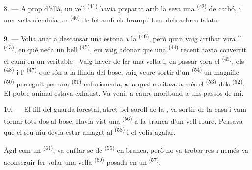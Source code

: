 8. --- A prop d'allà, un vell  \textsuperscript{(41)} havia
preparat amb la seva  una  \textsuperscript{(42)} de
carbó, i una vella s'enduia un  \textsuperscript{(40)} de
 fet amb els branquillons dels arbres talats.

\VUsaut{3.0mm}
\VUsaut{3.0mm}

9. --- Volia anar a descansar una estona a la 
\textsuperscript{(46)}, però quan vaig arribar vora l'
\textsuperscript{(43)}, en què neda un bell  \textsuperscript{(45)},
em vaig adonar que una  \textsuperscript{(44)} recent havia
convertit el camí en un veritable . Vaig haver de fer una volta
i, en passar vora el  \textsuperscript{(49)}, els 
\textsuperscript{(48)} i l' \textsuperscript{(47)} que són a la
llinda del bosc, vaig veure sortir d'un  \textsuperscript{(54)} un
magnífic  \textsuperscript{(50)} perseguit per una 
\textsuperscript{(51)} enfurismada, a la qual excitava a més el 
\textsuperscript{(53)} dels  \textsuperscript{(52)}. El
pobre animal estava exhaust. Va venir a caure moribund a uns passos de mi.

10. --- El fill del guarda forestal, atret pel soroll de la ,
va sortir de la casa i vam tornar tots dos al bosc. Havia vist una
 \textsuperscript{(56)} a la branca d'un vell roure. Pensava que el
seu niu devia estar amagat al  \textsuperscript{(58)} i el volia
agafar.

Àgil com un  \textsuperscript{(61)}, va enfilar-se de
 \textsuperscript{(55)} en branca, però no va trobar res i només va
aconseguir fer volar una vella  \textsuperscript{(60)} posada en
un  \textsuperscript{(57)}.
\VUsaut{4.0mm}
\VUfilet{22mm}
